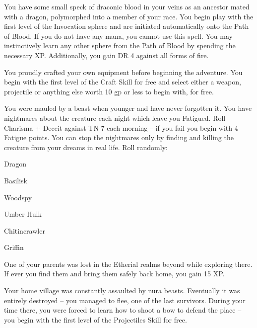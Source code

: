 \begin{multicols}{2}
\begin{list}{\addtocounter{list}{1}\textbf{:}}{\raggedleft}
\item{You have some small speck of draconic blood in your veins as an ancestor mated with a dragon, polymorphed into a member of your race.  You begin play with the first level of the Invocation sphere and are initiated automatically onto the Path of Blood.  If you do not have any mana, you cannot use this spell.  You may instinctively learn any other sphere from the Path of Blood by spending the necessary XP.  Additionally, you gain DR 4 against all forms of fire.}

\item{You proudly crafted your own equipment before beginning the adventure.  You begin with the first level of the Craft Skill for free and select either a weapon, projectile or anything else worth 10 gp or less to begin with, for free.}

\item{You were mauled by a beast when younger and have never forgotten it. You have nightmares about the creature each night which leave you Fatigued.  Roll Charisma + Deceit against TN 7 each morning -- if you fail you begin with 4 Fatigue points.  You can stop the nightmares only by finding and killing the creature from your dreams in real life.  Roll randomly:}

	\setcounter{enc}{6}

	\begin{list}{\addtocounter{enc}{-1}}{}

		\item Dragon

		\item Basilisk

		\item Woodspy

		\item Umber Hulk

		\item Chitincrawler

		\item Griffin

	\end{list}

\item{One of your parents was lost in the Etherial realms beyond while exploring there. If ever you find them and bring them safely back home, you gain 15 XP.}

\item{Your home village was constantly assaulted by nura beasts.  Eventually it was entirely destroyed -- you managed to flee, one of the last survivors. During your time there, you were forced to learn how to shoot a bow to defend the place -- you begin with the first level of the Projectiles Skill for free.}


\end{list}
\end{multicols}
